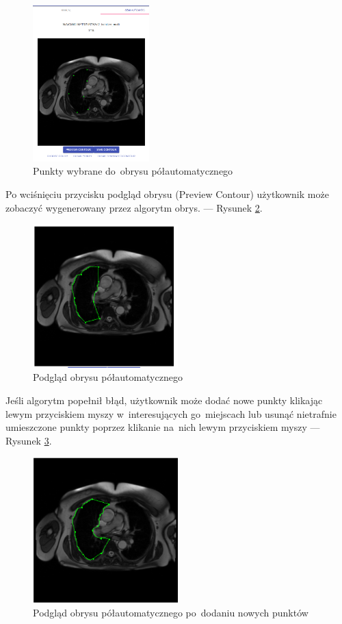\documentclass[a4paper,11pt,twoside,openright]{report}
\theoremstyle{definition}
\begin{document}
\begin{figure}[h!]
	\center
	\includegraphics[width=0.4\textwidth]{11}
	\caption{Punkty wybrane do~obrysu półautomatycznego}
    	\label{fig:11}
\end{figure}

\pagebreak

Po wciśnięciu przycisku podgląd obrysu (Preview Contour) użytkownik może
zobaczyć wygenerowany przez algorytm obrys. --- Rysunek \ref{fig:12}.

\begin{figure}[h!]
	\center
	\includegraphics[width=0.5\textwidth]{12}
	\caption{Podgląd obrysu półautomatycznego}
    	\label{fig:12}
\end{figure}

Jeśli algorytm popełnił błąd, użytkownik może dodać nowe punkty klikając lewym
przyciskiem myszy w~interesujących go~miejscach lub usunąć nietrafnie umieszczone
punkty poprzez klikanie na~nich lewym przyciskiem myszy --- Rysunek \ref{fig:13}.

\begin{figure}[h!]
	\center
	\includegraphics[width=0.5\textwidth]{13}
	\caption{Podgląd obrysu półautomatycznego po~dodaniu nowych punktów}
    	\label{fig:13}
\end{figure}
\end{document}
